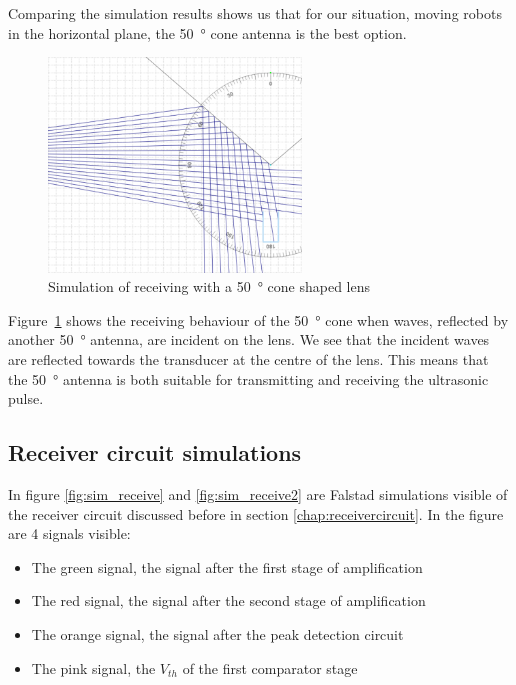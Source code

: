 Comparing the simulation results shows us that for our situation, moving robots in the horizontal plane, the \SI{50}{\degree} cone antenna is the best option.

\begin{figure}[H]
\centering
\includegraphics[width=0.6\textwidth]{Figures/sim_cone_rec.PNG}
\caption{Simulation of receiving with a \SI{50}{\degree} cone shaped lens}
\label{fig:sim_cone_rec}
\end{figure}

Figure~\ref{fig:sim_cone_rec} shows the receiving behaviour of the \SI{50}{\degree} cone when waves, reflected by another \SI{50}{\degree} antenna, are incident on the lens.
We see that the incident waves are reflected towards the transducer at the centre of the lens.
This means that the \SI{50}{\degree} antenna is both suitable for transmitting and receiving the ultrasonic pulse.

\subsection{Receiver circuit simulations}

In figure \ref{fig:sim_receive} and \ref{fig:sim_receive2} are Falstad \cite{Falstad}
simulations visible of the receiver circuit discussed before in section \ref{chap:receivercircuit}. In the figure are 4 signals visible:

\begin{itemize}
\item
The green signal, the signal after the first stage of amplification
\item
The red signal, the signal after the second stage of amplification
\item
The orange signal, the signal after the peak detection circuit
\item
The pink signal, the $V_{th}$ of the first comparator stage
\end{itemize}

